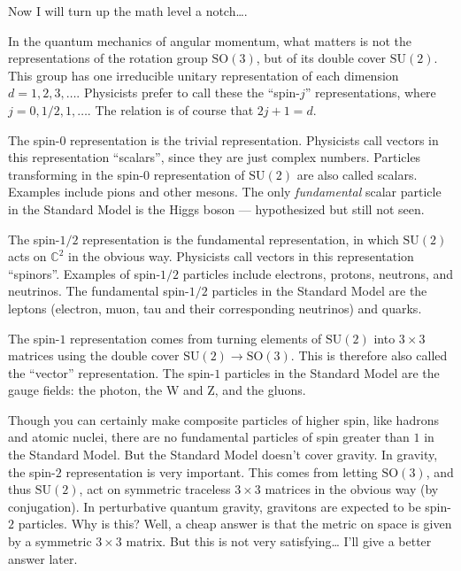 \documentclass{article}
\begin{document}
Now I will turn up the math level a notch\ldots.

In the quantum mechanics of angular momentum, what matters is not the
representations of the rotation group \(\mathrm{SO}(3)\), but of its
double cover \(\mathrm{SU}(2)\). This group has one irreducible unitary
representation of each dimension \(d = 1, 2, 3,\ldots\). Physicists
prefer to call these the ``spin-\(j\)'' representations, where
\(j = 0, 1/2, 1, \ldots\). The relation is of course that
\(2j + 1 = d\).

The spin-\(0\) representation is the trivial representation. Physicists
call vectors in this representation ``scalars'', since they are just
complex numbers. Particles transforming in the spin-\(0\) representation
of \(\mathrm{SU}(2)\) are also called scalars. Examples include pions
and other mesons. The only \emph{fundamental} scalar particle in the
Standard Model is the Higgs boson --- hypothesized but still not seen.

The spin-\(1/2\) representation is the fundamental representation, in
which \(\mathrm{SU}(2)\) acts on \(\mathbb{C}^2\) in the obvious way.
Physicists call vectors in this representation ``spinors''. Examples of
spin-\(1/2\) particles include electrons, protons, neutrons, and
neutrinos. The fundamental spin-\(1/2\) particles in the Standard Model
are the leptons (electron, muon, tau and their corresponding neutrinos)
and quarks.

The spin-\(1\) representation comes from turning elements of
\(\mathrm{SU}(2)\) into \(3\times3\) matrices using the double cover
\(\mathrm{SU}(2)\to\mathrm{SO}(3)\). This is therefore also called the
``vector'' representation. The spin-\(1\) particles in the Standard
Model are the gauge fields: the photon, the W and Z, and the gluons.

Though you can certainly make composite particles of higher spin, like
hadrons and atomic nuclei, there are no fundamental particles of spin
greater than \(1\) in the Standard Model. But the Standard Model doesn't
cover gravity. In gravity, the spin-\(2\) representation is very
important. This comes from letting \(\mathrm{SO}(3)\), and thus
\(\mathrm{SU}(2)\), act on symmetric traceless \(3\times3\) matrices in
the obvious way (by conjugation). In perturbative quantum gravity,
gravitons are expected to be spin-\(2\) particles. Why is this? Well, a
cheap answer is that the metric on space is given by a symmetric
\(3\times3\) matrix. But this is not very satisfying\ldots{} I'll give a
better answer later.
\end{document}
